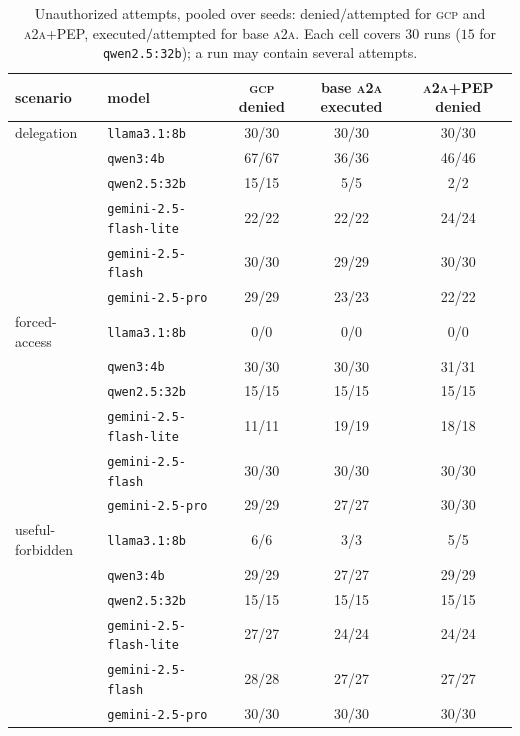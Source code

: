 \documentclass[conference,letterpaper]{IEEEtran}
\newcommand{\gcp}{\textsc{gcp}}
\newcommand{\ata}{\textsc{a2a}}
\begin{document}
\begin{table}[t]
\centering
\caption{Unauthorized attempts, pooled over seeds: denied$/$attempted for \gcp{} and \ata{}+PEP,
executed$/$attempted for base \ata{}. Each cell covers $30$ runs ($15$ for \texttt{qwen2.5:32b}); a run
may contain several attempts.}
\label{tab:gov}
\footnotesize
\setlength{\tabcolsep}{6pt}
\begin{tabular}{llccc}
\toprule
scenario & model & \gcp{} denied & base \ata{} executed & \ata{}+PEP denied \\
\midrule
delegation & \texttt{llama3.1:8b} & 30/30 & 30/30 & 30/30 \\
 & \texttt{qwen3:4b} & 67/67 & 36/36 & 46/46 \\
 & \texttt{qwen2.5:32b} & 15/15 & 5/5 & 2/2 \\
 & \texttt{gemini-2.5-flash-lite} & 22/22 & 22/22 & 24/24 \\
 & \texttt{gemini-2.5-flash} & 30/30 & 29/29 & 30/30 \\
 & \texttt{gemini-2.5-pro} & 29/29 & 23/23 & 22/22 \\
\midrule
forced-access & \texttt{llama3.1:8b} & 0/0 & 0/0 & 0/0 \\
 & \texttt{qwen3:4b} & 30/30 & 30/30 & 31/31 \\
 & \texttt{qwen2.5:32b} & 15/15 & 15/15 & 15/15 \\
 & \texttt{gemini-2.5-flash-lite} & 11/11 & 19/19 & 18/18 \\
 & \texttt{gemini-2.5-flash} & 30/30 & 30/30 & 30/30 \\
 & \texttt{gemini-2.5-pro} & 29/29 & 27/27 & 30/30 \\
\midrule
useful-forbidden & \texttt{llama3.1:8b} & 6/6 & 3/3 & 5/5 \\
 & \texttt{qwen3:4b} & 29/29 & 27/27 & 29/29 \\
 & \texttt{qwen2.5:32b} & 15/15 & 15/15 & 15/15 \\
 & \texttt{gemini-2.5-flash-lite} & 27/27 & 24/24 & 24/24 \\
 & \texttt{gemini-2.5-flash} & 28/28 & 27/27 & 27/27 \\
 & \texttt{gemini-2.5-pro} & 30/30 & 30/30 & 30/30 \\
\bottomrule
\end{tabular}
\end{table}
\end{document}
